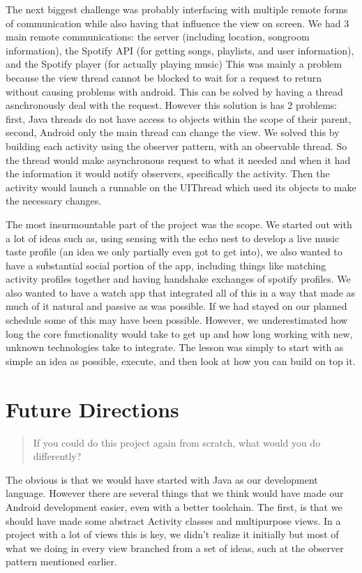 \documentclass[12pt]{article}
\begin{document}
The next biggest challenge was probably interfacing with multiple
remote forms of communication while also having that influence the
view on screen. We had 3 main remote communications: the server
(including location, songroom information), the Spotify API (for
getting songs, playlists, and user information), and the Spotify
player (for actually playing music) This was mainly a problem because
the view thread cannot be blocked to wait for a request to return
without causing problems with android. This can be solved by having a
thread asnchronously deal with the request. However this solution is
has 2 problems: first, Java threads do not have access to objects
within the scope of their parent, second, Android only the main thread
can change the view. We solved this by building each activity using
the observer pattern, with an observable thread. So the thread would
make asynchronous request to what it needed and when it had the
information it would notify observers, specifically the activity. Then
the activity would launch a runnable on the UIThread which used its
objects to make the necessary changes.

The most insurmountable part of the project was the scope. We started
out with a lot of ideas such as, using sensing with the echo nest to
develop a live music taste profile (an idea we only partially even got
to get into), we also wanted to have a substantial social portion of
the app, including things like matching activity profiles together and
having handshake exchanges of spotify profiles. We also wanted to have
a watch app that integrated all of this in a way that made as much of
it natural and passive as was possible. If we had stayed on our
planned schedule some of this may have been possible. However, we
underestimated how long the core functionality would take to get up
and how long working with new, unknown technologies take to
integrate. The lesson was simply to start with as simple an idea as
possible, execute, and then look at how you can build on top it.

\pagebreak


\section{Future Directions}

\begin{quote}
   If you could do this project again from scratch, what would you do
  differently?
\end{quote}

The obvious is that we would have started with Java as our development
language. However there are several things that we think would have
made our Android development easier, even with a better toolchain. The
first, is that we should have made some abstract Activity classes and
multipurpose views. In a project with a lot of views this is key, we
didn't realize it initially but most of what we doing in every view
branched from a set of ideas, such at the observer pattern mentioned
earlier.
\end{document}
